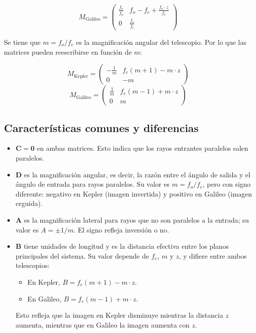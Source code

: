 \documentclass[11pt]{article}
\begin{document}
\[
M_{\text{Galileo}} = \begin{pmatrix} \frac{f_e}{f_o} & f_o - f_e + \frac{f_o \cdot z}{f_e} \\ 0 & \frac{f_o}{f_e} \end{pmatrix}
\]

Se tiene que \(m = f_o / f_e\) es la magnificación angular del telescopio. Por lo que las matrices pueden reescribirse en función de \(m\):

\[
M_{\text{Kepler}} = \begin{pmatrix} -\frac{1}{m} & f_e(m + 1) - m \cdot z \\ 0 & -m \end{pmatrix}
\]
\[
M_{\text{Galileo}} = \begin{pmatrix} \frac{1}{m} & f_e(m - 1) + m \cdot z \\ 0 & m \end{pmatrix}
\]

\subsection*{Características comunes y diferencias}

\begin{itemize}
  \item \(\mathbf{C=0}\) en ambas matrices. Esto indica que los rayos entrantes paralelos salen paralelos.
  \item \(\mathbf{D}\) es la magnificación angular, es decir, la razón entre el ángulo de salida y el ángulo de entrada para rayos paralelos. Su valor es \(m = f_o/f_e\), pero con signo diferente: negativo en Kepler (imagen invertida) y positivo en Galileo (imagen erguida).
  \item \(\mathbf{A}\) es la magnificación lateral para rayos que no son paralelos a la entrada; su valor es \(A=\pm 1/m\). El signo refleja inversión o no.
  \item \(\mathbf{B}\) tiene unidades de longitud y es la distancia efectiva entre los planos principales del sistema. Su valor depende de \(f_e\), \(m\) y \(z\), y difiere entre ambos telescopios:
    \begin{itemize}
      \item En Kepler, \(B = f_e(m + 1) - m \cdot z\).
      \item En Galileo, \(B = f_e(m - 1) + m \cdot z\).
    \end{itemize}
    Esto refleja que la imagen en Kepler disminuye mientras la distancia \(z\) aumenta, mientras que en Galileo la imagen aumenta con \(z\).
\end{itemize}
\end{document}
